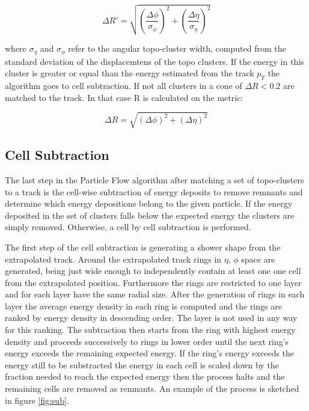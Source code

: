 \begin{equation}
\Delta R' = \sqrt{\left(\frac{\Delta \phi}{\sigma_{\phi}}\right)^2+\left(\frac{\Delta \eta}{\sigma_{\eta}}\right)^2}
\end{equation}

where $\sigma_{\eta}$ and $\sigma_{\phi}$ refer to the angular topo-cluster width, computed from the standard deviation of the displacemtens of the topo clusters. If the energy in this cluster is greater or equal than the energy estimated from the track $p_T$ the algorithm goes to cell subtraction. If not all clusters in a cone of $\Delta R < 0.2$ are matched to the track. In that case R is calculated on the metric:

\begin{equation}
\Delta R = \sqrt{(\Delta \phi)^2 + (\Delta \eta)^2}
\end{equation}

\subsection{Cell Subtraction}

The last step in the Particle Flow algorithm after matching a set of topo-clusters to a track is the cell-wise subtraction of energy deposits to remove remnants and determine which energy depositions belong to the given particle.
If the energy deposited in the set of clusters falls below the expected energy the clusters are simply removed. Otherwise, a cell by cell subtraction is performed.

The first step of the cell subtraction is generating a shower shape from the extrapolated track. Around the extrapolated track rings in $\eta$, $\phi$ space are generated, being just wide enough to independently contain at least one one cell from the extrapolated position. Furthermore the rings are restricted to one layer and for each layer have the same radial size.
After the generation of rings in each layer the average energy density in each ring is computed and the rings are ranked by energy density in descending order. The layer is not used in any way for this ranking.
The subtraction then starts from the ring with highest energy density and proceeds successively to rings in lower order until the next ring's energy exceeds the remaining expected energy.
If the ring's energy exceeds the energy still to be substracted the energy in each cell is scaled down by the fraction needed to reach the expected energy then the process halts and the remaining cells are removed as remnants.
An example of the process is sketched in figure \ref{fig:sub}. 




